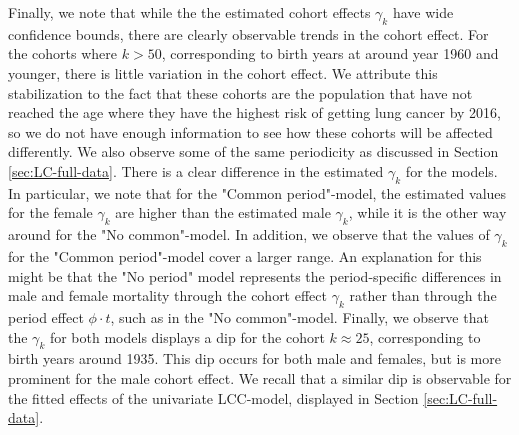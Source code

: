 \newpar Finally, we note that while the the estimated cohort effects $\gamma_k$ have wide confidence bounds, there are clearly observable trends in the cohort effect. For the cohorts where $k > 50$, corresponding to birth years at around year 1960 and younger, there is little variation in the cohort effect. We attribute this stabilization to the fact that these cohorts are the population that have not reached the age where they have the highest risk of getting lung cancer by 2016, so we do not have enough information to see how these cohorts will be affected differently. We also observe some of the same periodicity as discussed in Section \ref{sec:LC-full-data}. There is a clear difference in the estimated $\gamma_k$ for the models. In particular, we note that for the "Common period"-model, the estimated values for the female $\gamma_k$ are higher than the estimated male $\gamma_k$, while it is the other way around for the "No common"-model. In addition, we observe that the values of $\gamma_k$ for the "Common period"-model cover a larger range. An explanation for this might be that the "No period" model represents the period-specific differences in male and female mortality through the cohort effect $\gamma_k$ rather than through the period effect $\phi \cdot t$, such as in the "No common"-model. Finally, we observe that the $\gamma_k$ for both models displays a dip for the cohort $k \approx 25$, corresponding to birth years around 1935. This dip occurs for both male and females, but is more prominent for the male cohort effect. We recall that a similar dip is observable for the fitted effects of the univariate LCC-model, displayed in Section \ref{sec:LC-full-data}. 

